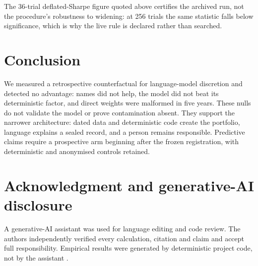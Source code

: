 \documentclass[10pt,conference]{IEEEtran}
\begin{document}
The 36-trial deflated-Sharpe figure quoted above certifies the archived run, not the procedure's robustness to widening: at 256 trials the same statistic falls below significance, which is why the live rule is declared rather than searched.

\section{Conclusion}

We measured a retrospective counterfactual for language-model discretion and detected no advantage: names did not help, the model did not beat its deterministic factor, and direct weights were malformed in five years. These nulls do not validate the model or prove contamination absent. They support the narrower architecture: dated data and deterministic code create the portfolio, language explains a sealed record, and a person remains responsible. Predictive claims require a prospective arm beginning after the frozen registration, with deterministic and anonymised controls retained.

\section*{Acknowledgment and generative-AI disclosure}
A generative-AI assistant was used for language editing and code review. The authors independently verified every calculation, citation and claim and accept full responsibility. Empirical results were generated by deterministic project code, not by the assistant \cite{openai}.
\end{document}
